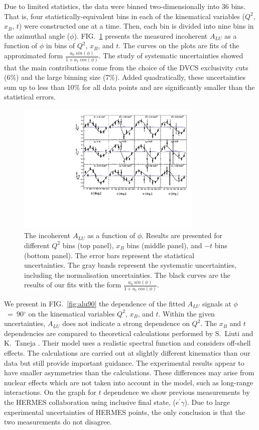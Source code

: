 \documentclass[twocolumn,nofootinbib,showpacs,prl,superscriptaddress,secnumarabic,amssymb,nobibnotes,aps,floatfix]{revtex4}
\begin{document}
Due to limited statistics, the data were binned two-dimensionally into 36 bins.  
That is, four statistically-equivalent bins in each of the kinematical 
variables ($Q^{2}$, $x_{B}$, $t$) were constructed one at a time. Then, each 
bin is divided into nine bins in the azimuthal angle ($\phi$).  
FIG.~\ref{fig:alu} presents the measured incoherent $A_{LU}$ as a function of 
$\phi$ in bins of $Q^{2}$, $x_{B}$, and $t$. The curves on the plots are fits 
of the approximated form $\frac{a_{0}~sin(\phi)}{1+ a_{1}~cos(\phi)}$. The 
study of systematic uncertainties showed that the main contributions come from 
the choice of the DVCS exclusivity cuts (6\%) and the large binning size (7\%).  
Added quadratically, these uncertainties sum up to less than 10\% for all data points and are significantly smaller than the statistical errors.

\begin{figure}[tb]
\includegraphics[width=8.9cm]{figs/incoherent_ALU_phi.pdf}
\caption{The incoherent $A_{LU}$ as a function of $\phi$. Results are presented
   for different $Q^{2}$ bins (top panel), $x_{B}$ bins (middle panel), and 
   $-t$ bins (bottom panel). The error bars represent the statistical 
   uncertainties. The gray bands represent the systematic uncertainties, 
   including the normalisation uncertainties. The black curves are the results 
   of our fits with the form $\frac{a_{0}~sin(\phi)}{1+ a_{1}~cos(\phi)}$.}
\label{fig:alu}
\end{figure}


We present in FIG.~\ref{fig:alu90} the dependence of the fitted $A_{LU}$ 
signals at $\phi$~=~90$^{\circ}$ on the kinematical variables $Q^2$, $x_{B}$, 
and $t$. Within the given uncertainties, $A_{LU}$ does not indicate a strong 
dependence on $Q^2$. The $x_{B}$ and $t$ dependencies are compared to 
theoretical calculations performed by S.~Liuti and K.~Taneja 
\cite{simonetta_2}. Their model uses a realistic spectral function and 
considers off-shell effects. The calculations are carried out at slightly 
different kinematics than our data but still provide important guidance. The 
experimental results appear to have smaller asymmetries than the calculations.  
These differences may arise from nuclear effects which are not taken into 
account in the model, such as long-range interactions. On the graph for $t$ dependence we show previous measurements by  the HERMES collaboration  \cite{Airapetian} using inclusive final state, ($e^\prime\gamma$). Due to large experimental uncertainties of HERMES points, the only conclusion is that the two measurements do not disagree. 
\end{document}
